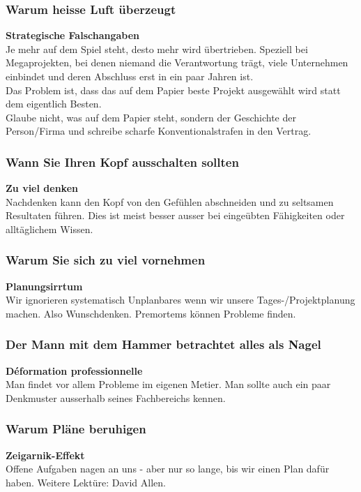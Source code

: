 \documentclass[a4paper, twocolumn]{article}
\begin{document}
\subsubsection*{Warum heisse Luft überzeugt}
\textbf{Strategische Falschangaben}\\
Je mehr auf dem Spiel steht, desto mehr wird übertrieben. Speziell bei Megaprojekten, bei denen niemand die Verantwortung trägt, viele Unternehmen einbindet und deren Abschluss erst in ein paar Jahren ist.\\
Das Problem ist, dass das auf dem Papier beste Projekt ausgewählt wird statt dem eigentlich Besten.\\
Glaube nicht, was auf dem Papier steht, sondern der Geschichte der Person/Firma und schreibe scharfe Konventionalstrafen in den Vertrag.

\subsubsection*{Wann Sie Ihren Kopf ausschalten sollten}
\textbf{Zu viel denken}\\
Nachdenken kann den Kopf von den Gefühlen abschneiden und zu seltsamen Resultaten führen. Dies ist meist besser ausser bei eingeübten Fähigkeiten oder alltäglichem Wissen.

\subsubsection*{Warum Sie sich zu viel vornehmen}
\textbf{Planungsirrtum}\\
Wir ignorieren systematisch Unplanbares wenn wir unsere Tages-/Projektplanung machen. Also Wunschdenken. Premortems können Probleme finden.

\subsubsection*{Der Mann mit dem Hammer betrachtet alles als Nagel}
\textbf{Déformation professionnelle}\\
Man findet vor allem Probleme im eigenen Metier. Man sollte auch ein paar Denkmuster ausserhalb seines Fachbereichs kennen.

\subsubsection*{Warum Pläne beruhigen}
\textbf{Zeigarnik-Effekt}\\
Offene Aufgaben nagen an uns - aber nur so lange, bis wir einen Plan dafür haben. Weitere Lektüre: David Allen.
\end{document}
